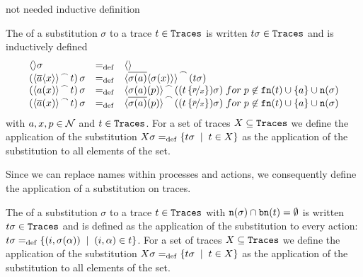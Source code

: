 \begin{old}{not needed inductive definition}
\begin{definition}
\label{def_substitution_traces}
The  of a substitution $\sigma$ to a trace $t\in\mathtt{Traces}$ is written $t\sigma\in\mathtt{Traces}$ and is inductively defined
	\begin{align*}
		\begin{array}{lcl}
			\eseq{}\sigma &\define& \eseq \\
			\left(\seqconc{\seq{\out{a}{x}}}{t}\right)\sigma &\define& \seqconc{\seq{\out{\sigma(a)}{\sigma(x)}}}{(t\sigma)} \\
			\left(\seqconc{\seq{\inp{a}{x}}}{t}\right)\sigma &\define& \seqconc{\seq{\inp{\sigma(a)}{p}}}{((t\subs{p}{x})\sigma)} \; for \; p\nin\fn{t}\cup\set{a}\cup\n{\sigma}\\
			\left(\seqconc{\seq{\bout{a}{x}}}{t}\right)\sigma &\define& \seqconc{\seq{\bout{\sigma(a)}{p}}}{((t\subs{p}{x})\sigma)}\; for \; p\nin\fn{t}\cup\set{a}\cup\n{\sigma}		\end{array}
	\end{align*}
with $a,x,p\in\mathcal N$ and $t\in\mathtt{Traces}$. For a set of traces $X\subseteq\mathtt{Traces}$ we define the application of the substitution $X\sigma\define\set[t\in{}X]{t\sigma}$ as the application of the substitution to all elements of the set.
\end{definition}
\end{old}

Since we can replace names within processes and actions, we consequently define the application of a substitution on traces.

\begin{definition}
\label{def_substitution_traces}
The  of a substitution $\sigma$ to a trace $t\in\mathtt{Traces}$ with $\mathtt{n}(\sigma)\cap\mathtt{bn}(t)=\emptyset$ is written $t\sigma\in\mathtt{Traces}$ and is defined as the application of the substitution to every action: $t\sigma\define\set[(i,\alpha)\in{}t]{(i,\substF(\alpha))}$. For a set of traces $X\subseteq\mathtt{Traces}$ we define the application of the substitution $X\sigma\define\set[t\in{}X]{t\sigma}$ as the application of the substitution to all elements of the set.
\end{definition}

